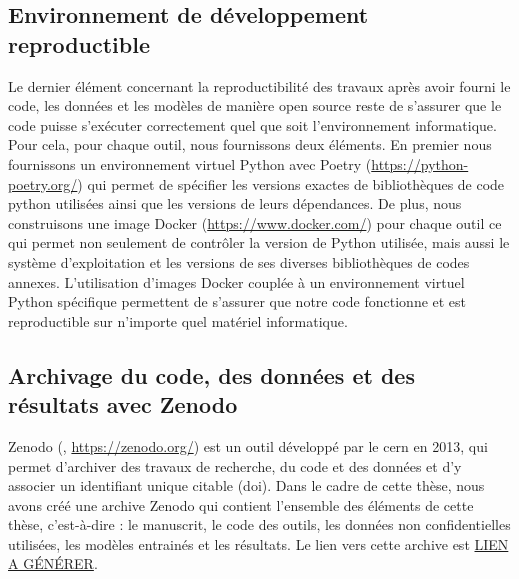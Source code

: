 \subsection{Environnement de développement reproductible}
Le dernier élément concernant la reproductibilité des travaux après avoir fourni le code, les données et les modèles de manière open source reste de s'assurer que le code puisse s'exécuter correctement quel que soit l'environnement informatique. Pour cela, pour chaque outil, nous fournissons deux éléments. En premier nous fournissons un environnement virtuel Python avec Poetry (\href{https://python-poetry.org/}{https://python-poetry.org/}) qui permet de spécifier les versions exactes de bibliothèques de code python utilisées ainsi que les versions de leurs dépendances. De plus, nous construisons une image Docker (\href{https://www.docker.com/}{https://www.docker.com/}) pour chaque outil ce qui permet non seulement de contrôler la version de Python utilisée, mais aussi le système d'exploitation et les versions de ses diverses bibliothèques de codes annexes. L'utilisation d'images Docker couplée à un environnement virtuel Python spécifique permettent de s'assurer que notre code fonctionne et est reproductible sur n'importe quel matériel informatique.

\subsection{Archivage du code, des données et des résultats avec Zenodo}
Zenodo  (\cite{european_organization_for_nuclear_research_zenodo_2013}, \href{https://zenodo.org/}{https://zenodo.org/}) est un outil développé par le \gls{cern} en 2013, qui permet d'archiver des travaux de recherche, du code et des données et d'y associer un identifiant unique citable (\gls{doi}). Dans le cadre de cette thèse, nous avons créé une archive Zenodo qui contient l'ensemble des éléments de cette thèse, c'est-à-dire : le manuscrit, le code des outils, les données non confidentielles utilisées, les modèles entrainés et les résultats. Le lien vers cette archive est \href{LIEN A GENERER}{LIEN A GÉNÉRER}.